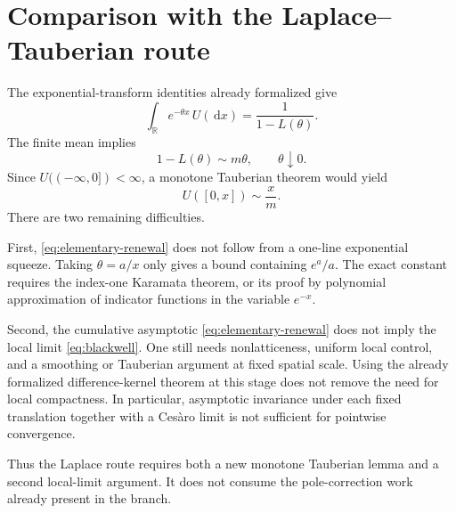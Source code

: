 \documentclass[10pt,reqno,a4paper]{amsart}
\numberwithin{equation}{section}
\theoremstyle{plain}
\theoremstyle{definition}
\theoremstyle{remark}
\newcommand{\R}{\mathbb{R}}
\newcommand{\1}{\mathbf{1}}
\newcommand{\de}{\,\mathrm{d}}
\begin{document}
\section{Comparison with the Laplace--Tauberian route}\label{sec:tauberian}

The exponential-transform identities already formalized give
\begin{equation}\label{eq:renewal-laplace}
  \int_\R e^{-\theta x}\,U(\de x)
  =
  \frac{1}{1-L(\theta)}.
\end{equation}
The finite mean implies
\begin{equation}\label{eq:laplace-asymptotic}
  1-L(\theta)\sim m\theta,
  \qquad \theta\downarrow0.
\end{equation}
Since \(U((-\infty,0])<\infty\), a monotone Tauberian theorem would yield
\begin{equation}\label{eq:elementary-renewal}
  U([0,x])\sim\frac{x}{m}.
\end{equation}
There are two remaining difficulties.

First, \cref{eq:elementary-renewal} does not follow from a one-line
exponential squeeze.  Taking \(\theta=a/x\) only gives a bound containing
\(e^a/a\).  The exact constant requires the index-one Karamata theorem, or
its proof by polynomial approximation of indicator functions in the variable
\(e^{-x}\).

Second, the cumulative asymptotic \cref{eq:elementary-renewal} does not imply
the local limit \cref{eq:blackwell}.  One still needs nonlatticeness, uniform
local control, and a smoothing or Tauberian argument at fixed spatial scale.
Using the already formalized difference-kernel theorem at this stage does not
remove the need for local compactness.  In particular, asymptotic invariance
under each fixed translation together with a Cesàro limit is not sufficient
for pointwise convergence.

Thus the Laplace route requires both a new monotone Tauberian lemma and a
second local-limit argument.  It does not consume the pole-correction work
already present in the branch.
\end{document}
